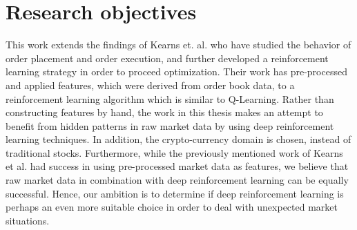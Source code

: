 \section{Research objectives}

This work extends the findings of Kearns et. al. who have studied the behavior of order placement and order execution\cite{nevmyvaka2005electronic}, and further developed a reinforcement learning strategy\cite{nevmyvaka2006reinforcement} in order to proceed optimization.
Their work has pre-processed and applied features, which were derived from order book data, to a reinforcement learning algorithm which is similar to Q-Learning.
Rather than constructing features by hand, the work in this thesis makes an attempt to benefit from hidden patterns in raw market data by using deep reinforcement learning techniques.
In addition, the crypto-currency domain is chosen, instead of traditional stocks.
Furthermore, while the previously mentioned work of Kearns et al. had success in using pre-processed market data as features, we believe that raw market data in combination with deep reinforcement learning can be equally successful.
Hence, our ambition is to determine if deep reinforcement learning is perhaps an even more suitable choice in order to deal with unexpected market situations.

